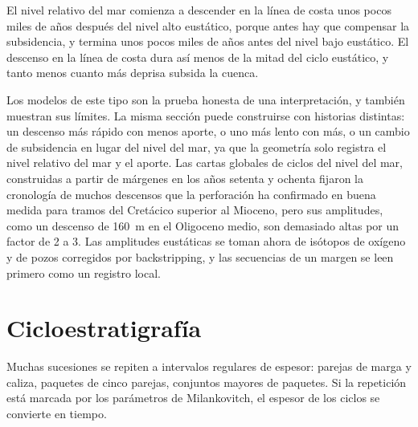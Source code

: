 \begin{omfigure}
\par{}\label{fig:b3:sequence-stratigraphy:section}
\end{omfigure}


El nivel relativo del mar comienza a descender en la línea de costa unos pocos miles de años
después del nivel alto eustático, porque antes hay que compensar la subsidencia,
y termina unos pocos miles de años antes del nivel bajo eustático. El descenso en
la línea de costa dura así menos de la mitad del ciclo eustático, y tanto menos cuanto
más deprisa subsida la cuenca.

Los modelos de este tipo son la prueba honesta de una interpretación, y también muestran
sus límites. La misma sección puede construirse con historias distintas: un descenso
más rápido con menos aporte, o uno más lento con más, o un cambio de subsidencia
en lugar del nivel del mar, ya que la geometría solo registra el nivel relativo del mar
y el aporte. Las cartas globales de ciclos del nivel del mar, construidas a partir de márgenes en
los años setenta y ochenta fijaron la cronología de muchos descensos que la perforación ha confirmado
en buena medida para tramos del Cretácico superior al Mioceno, pero sus
amplitudes, como un descenso de \qty{160}{m} en el Oligoceno medio, son demasiado
altas por un factor de 2 a 3. Las amplitudes eustáticas se toman ahora de
isótopos de oxígeno y de pozos corregidos por backstripping, y las secuencias de un margen se
leen primero como un registro local.

\section{Cicloestratigrafía}\label{sec:b3:sequence-stratigraphy:cyclo}

Muchas sucesiones se repiten a intervalos regulares de espesor: parejas
de marga y caliza, paquetes de cinco parejas, conjuntos mayores de paquetes. Si
la repetición está marcada por los parámetros de Milankovitch, el espesor de los
ciclos se convierte en tiempo.

